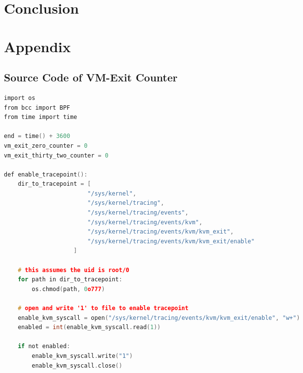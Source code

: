 \documentclass{report}
\begin{document}
\begin{spacing}{1.5}
\chapter{Conclusion}



























{\large


}




\chapter{Appendix}

\section{Source Code of VM-Exit Counter}


\begin{lstlisting}[caption={Source Code of VM-EXIT Counter},captionpos=b,language=c,firstnumber=1]
import os
from bcc import BPF
from time import time

end = time() + 3600
vm_exit_zero_counter = 0
vm_exit_thirty_two_counter = 0

def enable_tracepoint():
    dir_to_tracepoint = [
                        "/sys/kernel", 
                        "/sys/kernel/tracing", 
                        "/sys/kernel/tracing/events", 
                        "/sys/kernel/tracing/events/kvm", 
                        "/sys/kernel/tracing/events/kvm/kvm_exit", 
                        "/sys/kernel/tracing/events/kvm/kvm_exit/enable"
                    ]

    # this assumes the uid is root/0
    for path in dir_to_tracepoint:
        os.chmod(path, 0o777)

    # open and write '1' to file to enable tracepoint
    enable_kvm_syscall = open("/sys/kernel/tracing/events/kvm/kvm_exit/enable", "w+")
    enabled = int(enable_kvm_syscall.read(1))

    if not enabled:
        enable_kvm_syscall.write("1")
        enable_kvm_syscall.close()
        

\end{lstlisting}
\end{spacing}
\end{document}
